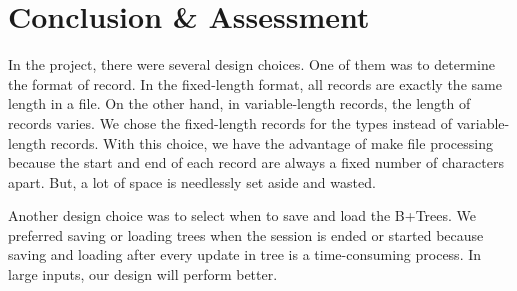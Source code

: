 \documentclass{article}
\begin{document}
\section{Conclusion \& Assessment}
\label{sec:conclusion}
In the project, there were several design choices. One of them was to determine the format of record. In the fixed-length format, all records are exactly the same length in a file. On the other hand, in variable-length records, the length of records varies. We chose the fixed-length records for the types instead of variable-length records. With this choice, we have the advantage of make file processing because the start and end of each record are always a fixed number of characters apart. But, a lot of space is needlessly set aside and wasted.

Another design choice was to select when to save and load the B+Trees. We preferred saving or loading trees when the session is ended or started because saving and loading after every update in tree is a time-consuming process. In large inputs, our design will perform better.
\end{document}
